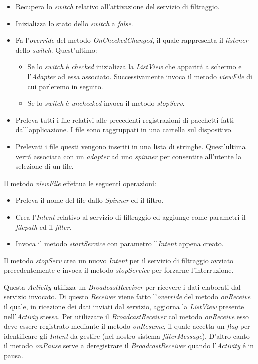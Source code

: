 \documentclass[12pt]{article} %
\begin{document}
\begin{itemize}
\item Recupera lo \textit{switch} relativo all'attivazione del servizio di filtraggio.
\item Inizializza lo stato dello \textit{switch} a \textit{false}.
\item Fa l'\textit{override} del metodo \textit{OnCheckedChanged}, il quale rappresenta il \textit{listener} dello \textit{switch}. Quest'ultimo:
\begin{itemize}
\item Se lo \textit{switch} \'e \textit{checked} inizializza la \textit{ListView} che apparir\'a a schermo e l'\textit{Adapter} ad essa associato. Successivamente invoca il metodo \textit{viewFile} di cui parleremo in seguito.
\item Se lo \textit{switch} \'e \textit{unchecked} invoca il metodo \textit{stopServ}.
\end{itemize}
\item Preleva tutti i file relativi alle precedenti registrazioni di pacchetti fatti dall'applicazione. I file sono raggruppati in una cartella sul dispositivo.
\item Prelevati i file questi vengono inseriti in una lista di stringhe. Quest'ultima verr\'a associata con un \textit{adapter} ad uno \textit{spinner} per consentire all'utente la selezione di un file.
\end{itemize}

Il metodo \textit{viewFile} effettua le seguenti operazioni:

\begin{itemize}
\item Preleva il nome del file dallo \textit{Spinner} ed il filtro.
\item Crea l'\textit{Intent} relativo al servizio di filtraggio ed aggiunge come parametri il \textit{filepath} ed il \textit{filter}.
\item Invoca il metodo \textit{startService} con parametro l'\textit{Intent} appena creato.
\end{itemize}

Il metodo \textit{stopServ} crea un nuovo \textit{Intent} per il servizio di filtraggio avviato precedentemente e invoca il metodo \textit{stopService} per forzarne l'interruzione.

Questa \textit{Activity} utilizza un \textit{BroadcastReceiver} per ricevere i dati elaborati dal servizio invocato. Di questo \textit{Receiver} viene fatto l'\textit{override} del metodo \textit{onReceive} il quale, in ricezione dei dati inviati dal servizio, aggiorna la \textit{ListView} presente nell'\textit{Activiy} stessa. Per utilizzare il \textit{BroadcastReceiver} col metodo \textit{onReceive} esso deve essere registrato mediante il metodo \textit{onResume}, il quale accetta un \textit{flag} per identificare gli \textit{Intent} da gestire (nel nostro sistema \textit{filterMessage}). D'altro canto il metodo \textit{onPause} serve a deregistrare il \textit{BroadcastReceiver} quando l'\textit{Activity} \'e in pausa.
\end{document}
